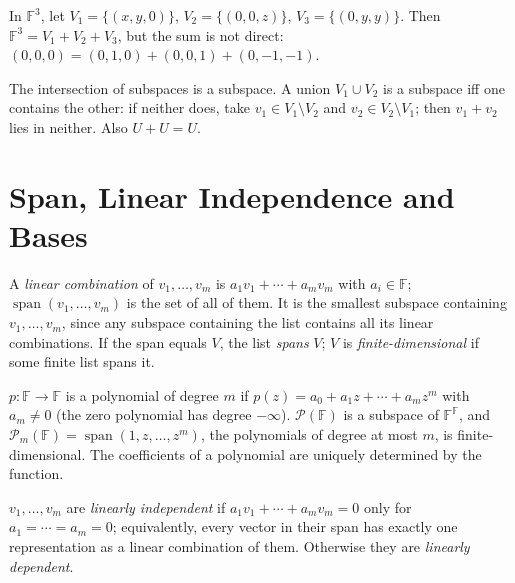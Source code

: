 \begin{example}
In $\mathbb{F}^3$, let $V_1 = \{(x,y,0)\}$, $V_2 = \{(0,0,z)\}$, $V_3 = \{(0,y,y)\}$. Then $\mathbb{F}^3 = V_1+V_2+V_3$, but the sum is not direct: $(0,0,0) = (0,1,0)+(0,0,1)+(0,-1,-1)$.
\end{example}

\begin{fact}
The intersection of subspaces is a subspace. A union $V_1\cup V_2$ is a subspace iff one contains the other: if neither does, take $v_1\in V_1\setminus V_2$ and $v_2\in V_2\setminus V_1$; then $v_1+v_2$ lies in neither. Also $U+U = U$.
\end{fact}

\section{Span, Linear Independence and Bases}

\begin{definition}[Span]
A \emph{linear combination} of $v_1,\ldots,v_m$ is $a_1v_1+\cdots+a_mv_m$ with $a_i\in\mathbb{F}$; $\operatorname{span}(v_1,\ldots,v_m)$ is the set of all of them. It is the smallest subspace containing $v_1,\ldots,v_m$, since any subspace containing the list contains all its linear combinations. If the span equals $V$, the list \emph{spans} $V$; $V$ is \emph{finite-dimensional} if some finite list spans it.
\end{definition}

\begin{definition}[Polynomials]
$p:\mathbb{F}\to\mathbb{F}$ is a polynomial of degree $m$ if $p(z) = a_0 + a_1z+\cdots+a_mz^m$ with $a_m\neq0$ (the zero polynomial has degree $-\infty$). $\mathcal{P}(\mathbb{F})$ is a subspace of $\mathbb{F}^{\mathbb{F}}$, and $\mathcal{P}_m(\mathbb{F}) = \operatorname{span}(1,z,\ldots,z^m)$, the polynomials of degree at most $m$, is finite-dimensional. The coefficients of a polynomial are uniquely determined by the function.
\end{definition}

\begin{definition}
$v_1,\ldots,v_m$ are \emph{linearly independent} if $a_1v_1+\cdots+a_mv_m = 0$ only for $a_1 = \cdots = a_m = 0$; equivalently, every vector in their span has exactly one representation as a linear combination of them. Otherwise they are \emph{linearly dependent}.
\end{definition}

